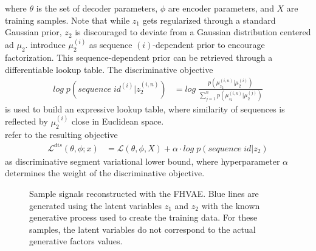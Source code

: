 \documentclass{article} %
\begin{document}
where $\theta$ is the set of decoder parameters, $\phi$ are encoder parameters, and $X$ are training samples. Note that while $z_1$ gets regularized through a standard Gaussian prior, $z_2$ is discouraged to deviate from a Gaussian distribution centered ad $\mu_2$. \citet{hsu2017unsupervised} introduce $\mu_{2}^{(i)}$ as sequence $(i)$-dependent prior to encourage factorization. This sequence-dependent prior can be retrieved through a differentiable lookup table. The discriminative objective 
\begin{align*}
log\;p(sequence\;id^{(i)} | z_2^{(i,n)})& = log\;\frac{p(\mu_{z_2}^{(i,n)}|\mu_2^{(i)})}{\sum^{n}_{j=1}	p(\mu_{z_2}^{(i,n)}|\mu_2^{(j)})}
\end{align*}
is used to build an expressive lookup table, where similarity of sequences is reflected by $\mu_{2}^{(i)}$ close in Euclidean space.\\
\citet{hsu2017unsupervised} refer to the resulting objective
\begin{align*}
\mathcal{L}^{dis}(\theta, \phi;x)& = \mathcal{L}(\theta, \phi, X) + \alpha \cdot log\;p(sequence\;id | z_2)
\end{align*}
as discriminative segment variational lower bound, where hyperparameter $\alpha$ determines the weight of the discriminative objective.



\begin{figure}[t]\scriptsize
	\centering
	\caption{Sample signals reconstructed with the FHVAE. Blue lines are generated using the latent variables $z_1$ and $z_2$ with the known generative process used to create the training data. For these samples, the latent variables do not correspond to the actual generative factors values.}
	\label{fig:samples}
\end{figure}
\end{document}
